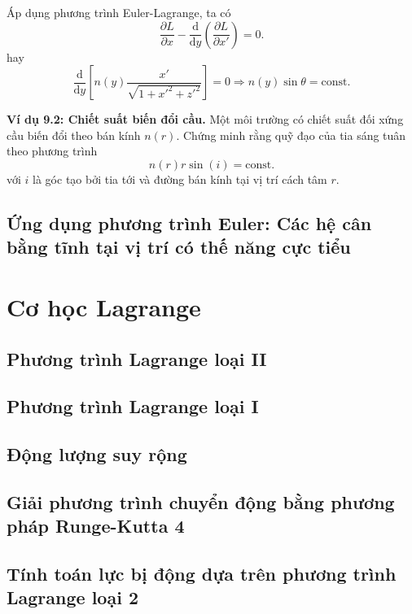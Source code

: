 Áp dụng phương trình Euler-Lagrange, ta có
\begin{equation}
    \frac{\partial L}{\partial x} - \frac{\mathrm{d}}{\mathrm{d}y} \left( \frac{\partial L}{\partial x'} \right)= 0.
\end{equation}
hay
\begin{equation}
    \dfrac{\mathrm{d}}{\mathrm{d} y} \left[ n(y) \dfrac{x'}{\sqrt{1+x'^2+z'^2}} \right]= 0 \Rightarrow n(y) \sin \theta = \text{const}.
\end{equation}

\textbf{Ví dụ 9.2: Chiết suất biến đổi cầu.} Một môi trường có chiết suất đối xứng cầu biến đổi theo bán kính \(n(r)\). Chứng minh rằng quỹ đạo của tia sáng tuân theo phương trình
\begin{equation}
    n(r) r \sin \left( i \right) = \text{const}.
\end{equation}
với \(i\) là góc tạo bởi tia tới và đường bán kính tại vị trí cách tâm \(r\).

\subsection{Ứng dụng phương trình Euler: Các hệ cân bằng tĩnh tại vị trí có thế năng cực tiểu}

\section{Cơ học Lagrange}

\subsection{Phương trình Lagrange loại II}

\subsection{Phương trình Lagrange loại I}

\subsection{Động lượng suy rộng}

\subsection{Giải phương trình chuyển động bằng phương pháp Runge-Kutta 4}

\subsection{Tính toán lực bị động dựa trên phương trình Lagrange loại 2}


